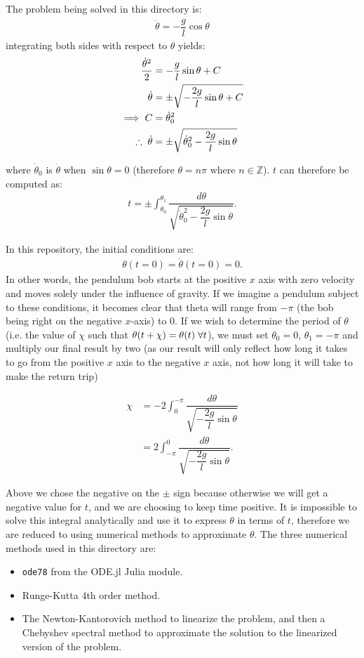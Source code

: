 \documentclass[12pt,a4paper,openright]{article}
\begin{document}
	The problem being solved in this directory is:
	\begin{align*}
	\ddot{\theta} = -\dfrac{g}{l} \cos{\theta}
	\end{align*}
	integrating both sides with respect to $\theta$ yields:
	\begin{align*}
		\dfrac{\dot{\theta}^2}{2} &= -\dfrac{g}{l} \sin{\theta} + C \\
		\dot{\theta} &= \pm \sqrt{-\dfrac{2g}{l} \sin{\theta} + C}\\
		\implies C &= \dot{\theta}_0^2 \\
		\therefore \hspace{0.1cm} \dot{\theta} &= \pm \sqrt{\dot{\theta}_0^2 - \dfrac{2g}{l} \sin{\theta}}
	\end{align*}
	
	where $\dot{\theta}_0$ is $\dot{\theta}$ when $\sin{\theta} = 0$ (therefore $\theta =n\pi$ where $n\in\mathbb{Z}$). $t$ can therefore be computed as:
	\begin{align*}
	t = \pm \int_{\theta_0}^{\theta_1} \dfrac{d\theta}{\sqrt{\dot{\theta}_0^2 - \dfrac{2g}{l} \sin{\theta}}}.
	\end{align*}
	
	In this repository, the initial conditions are:
	\begin{align*}
	\theta(t=0) = \dot{\theta}(t=0) = 0.
	\end{align*}
	In other words, the pendulum bob starts at the positive $x$ axis with zero velocity and moves solely under the influence of gravity. If we imagine a pendulum subject to these conditions, it becomes clear that theta will range from $-\pi$ (the bob being right on the negative $x$-axis) to $0$. If we wish to determine the period of $\theta$ (i.e. the value of $\chi$ such that $\theta(t+\chi) = \theta(t) \hspace{0.1cm}\forall t$), we must set $\theta_0=0$, $\theta_1 = -\pi$ and multiply our final result by two (as our result will only reflect how long it takes to go from the positive $x$ axis to the negative $x$ axis, not how long it will take to make the return trip)
	
	\begin{align*}
	\chi &= - 2\int_{0}^{-\pi} \dfrac{d\theta}{\sqrt{- \dfrac{2g}{l} \sin{\theta}}} \\
	  &= 2\int_{-\pi}^{0} \dfrac{d\theta}{\sqrt{- \dfrac{2g}{l} \sin{\theta}}}.
	\end{align*}
	
	Above we chose the negative on the $\pm$ sign because otherwise we will get a negative value for $t$, and we are choosing to keep time positive. It is impossible to solve this integral analytically and use it to express $\theta$ in terms of $t$, therefore we are reduced to using numerical methods to approximate $\theta$. The three numerical methods used in this directory are:
	
	\begin{itemize}
		\item \texttt{ode78} from the  ODE.jl Julia module.
		\item Runge-Kutta 4th order method. 
		\item The Newton-Kantorovich method to linearize the problem, and then a Chebyshev spectral method to approximate the solution to the linearized version of the problem.
	\end{itemize}
\end{document}
